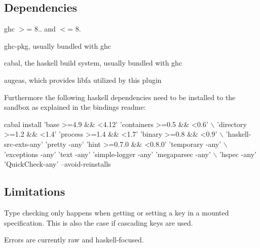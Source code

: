 \subsection*{Dependencies}


\begin{DoxyItemize}
\item ghc $>$= 8.. and $<$= 8.
\item ghc-\/pkg, usually bundled with ghc
\item cabal, the haskell build system, usually bundled with ghc
\item augeas, which provides libfa utilized by this plugin
\end{DoxyItemize}

Furthermore the following haskell dependencies need to be installed to the sandbox as explained in the bindings readme\+:


\begin{DoxyCode}
cabal install 'base >=4.9 && <4.12' 'containers >=0.5 && <0.6' \(\backslash\)
        'directory >=1.2 && <1.4' 'process >=1.4 && <1.7' 'binary >=0.8 && <0.9' \(\backslash\)
        'haskell-src-exts-any' 'pretty -any' 'hint >=0.7.0 && <0.8.0' 'temporary -any' \(\backslash\)
        'exceptions -any' 'text -any' 'simple-logger -any' 'megaparsec -any' \(\backslash\)
        'hspec -any' 'QuickCheck-any' --avoid-reinstalls
\end{DoxyCode}


\subsection*{Limitations}


\begin{DoxyItemize}
\item Type checking only happens when getting or setting a key in a mounted specification. This is also the case if cascading keys are used.
\item Errors are currently raw and haskell-\/focused. 
\end{DoxyItemize}